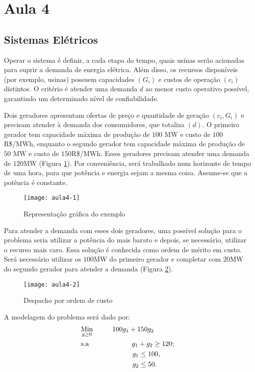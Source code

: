\section{Aula 4}
\label{sec:4}

\subsection{Sistemas Elétricos}
Operar o sistema é definir, a cada etapa do tempo, quais usinas serão acionadas para suprir a demanda de energia elétrica. Além disso, os
recursos disponíveis (por exemplo, usinas) possuem capacidades $(G_{i})$ e custos de operação $(c_{i})$ distintos. O critério é atender uma demanda $d$ ao menor custo operativo possível, garantindo um determinado nível de confiabilidade. 

\begin{exemplo}
Dois geradores apresentam ofertas de preço e quantidade de geração $(c_{i},G_{i})$ e precisam atender à demanda dos consumidores, que
totaliza $(d)$. O primeiro gerador tem capacidade máxima de produção de $100$ MW e custo de $100$R\$/MWh, enquanto o segundo gerador tem
capacidade máxima de produção de $50$ MW e custo de $150$R\$/MWh. Esses geradores precisam atender uma demanda de $120$MW (Figura \ref{fig:aula4-1}). Por conveniência, será trabalhado num horizonte de tempo de uma hora, para que potência
e energia sejam a mesma coisa. Assume-se que a potência é constante.
\begin{figure}[H]
\begin{centering}
\texttt{[image: aula4-1]}\protect\caption{\label{fig:aula4-1} Representação gráfica do exemplo }
\end{centering}
\end{figure}
Para atender a demanda com esses dois geradores, uma possível solução para o problema seria utilizar a potência do mais barato e depois, se necessário, utilizar o recurso mais caro. Essa solução é conhecida como ordem de mérito em custo. Será necessário utilizar os $100$MW
do primeiro gerador e completar com $20$MW do segundo gerador para atender a demanda (Figura \ref{fig:aula4-2}).
\begin{figure}[H]
\begin{centering}
\texttt{[image: aula4-2]}\protect\caption{\label{fig:aula4-2} Despacho por ordem de custo }
\end{centering}
\end{figure}
A modelagem do problema será dado por:
\begin{align}
    & \underset{g\geq0}{\text{Min}} \hspace{1cm} 100g_1+150g_2 \label{eq1} \\
    & \text{s.a}  \hspace{2.2cm} g_1+g_2 \geq 120; \label{eq2} \\
    &             \hspace{2.65cm} g_1\leq 100, \label{eq3}\\
    &             \hspace{2.65cm} g_2\leq 50. \label{eq4}
\end{align}


\end{exemplo}
